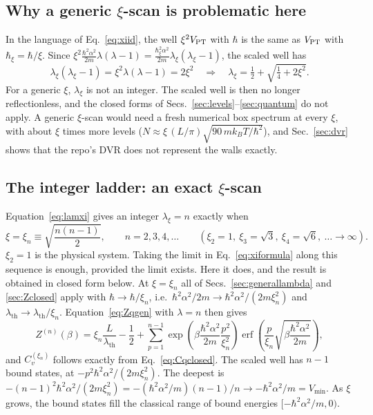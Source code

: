 \documentclass[11pt]{article}
\numberwithin{equation}{section}
\providecommand{\erf}{\operatorname{erf}}
\newcommand{\lth}{\lambda_{\mathrm{th}}}
\newcommand{\kB}{k_{B}}
\begin{document}
\subsection{Why a generic \texorpdfstring{$\xi$}{xi}-scan is problematic here}
In the language of Eq.~\eqref{eq:xiid}, the well $\xi^2V_{\rm PT}$ with $\hbar$ is the same as $V_{\rm PT}$ with $\hbar_\xi=\hbar/\xi$. Since
$\xi^2\frac{\hbar^2\alpha^2}{2m}\lambda(\lambda-1)=\frac{\hbar_\xi^2\alpha^2}{2m}\lambda_\xi(\lambda_\xi-1)$, the scaled well has
\begin{equation}
\lambda_\xi(\lambda_\xi-1)=\xi^2\lambda(\lambda-1)=2\xi^2\quad\Longrightarrow\quad\lambda_\xi=\tfrac12+\sqrt{\tfrac14+2\xi^2}.
\label{eq:lamxi}
\end{equation}
For a generic $\xi$, $\lambda_\xi$ is not an integer. The scaled well is then no longer reflectionless, and the closed forms of Secs.~\ref{sec:levels}--\ref{sec:quantum} do not apply. A generic $\xi$-scan would need a fresh numerical box spectrum at every $\xi$, with about $\xi$ times more levels ($N\approx\xi\,(L/\pi)\sqrt{90\,m\kB T/\hbar^2}$), and Sec.~\ref{sec:dvr} shows that the repo's DVR does not represent the walls exactly.

\subsection{The integer ladder: an exact \texorpdfstring{$\xi$}{xi}-scan}
Equation~\eqref{eq:lamxi} gives an integer $\lambda_\xi=n$ exactly when
\begin{equation}
\xi=\xi_n\equiv\sqrt{\frac{n(n-1)}{2}},\qquad n=2,3,4,\dots\qquad(\xi_2=1,\ \xi_3=\sqrt3,\ \xi_4=\sqrt6,\ \dots\to\infty).
\label{eq:ladder}
\end{equation}
$\xi_2=1$ is the physical system. Taking the limit in Eq.~\eqref{eq:xiformula} along this sequence is enough, provided the limit exists. Here it does, and the result is obtained in closed form below. At $\xi=\xi_n$ all of Secs.~\ref{sec:generallambda} and \ref{sec:Zclosed} apply with $\hbar\to\hbar/\xi_n$, i.e.\ $\hbar^2\alpha^2/2m\to\hbar^2\alpha^2/(2m\xi_n^2)$ and $\lth\to\lth/\xi_n$. Equation~\eqref{eq:Zqgen} with $\lambda=n$ then gives
\begin{equation}
\boxed{\;Z^{(n)}(\beta)=\xi_n\frac{L}{\lth}-\frac12+\sum_{p=1}^{n-1}\exp\!\left(\beta\frac{\hbar^2\alpha^2}{2m}\frac{p^2}{\xi_n^2}\right)\erf\!\left(\frac{p}{\xi_n}\sqrt{\beta\frac{\hbar^2\alpha^2}{2m}}\right),\;}
\label{eq:Zn}
\end{equation}
and $C_v^{(\xi_n)}$ follows exactly from Eq.~\eqref{eq:Cqclosed}. The scaled well has $n-1$ bound states, at $-p^2\hbar^2\alpha^2/(2m\xi_n^2)$. The deepest is $-(n-1)^2\hbar^2\alpha^2/(2m\xi_n^2)=-(\hbar^2\alpha^2/m)(n-1)/n\to-\hbar^2\alpha^2/m=V_{\min}$. As $\xi$ grows, the bound states fill the classical range of bound energies $[-\hbar^2\alpha^2/m,0)$.
\end{document}
